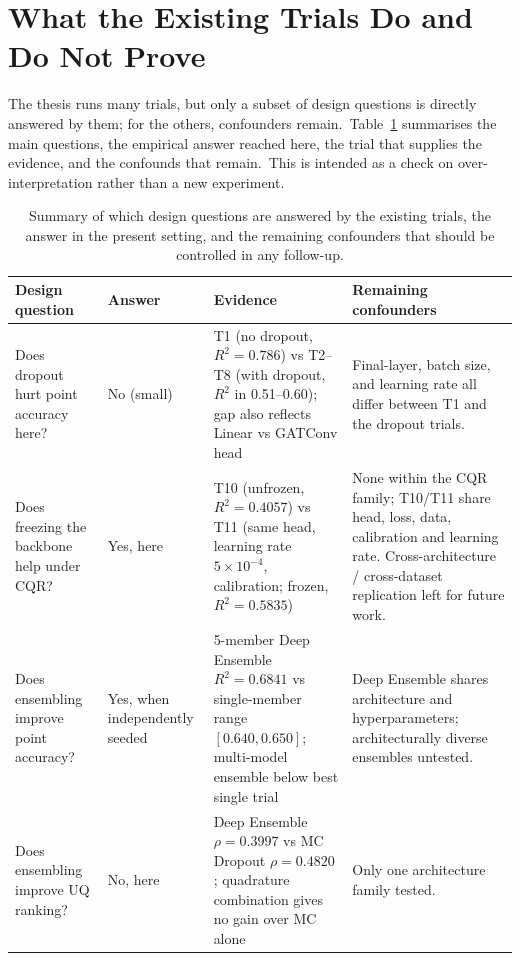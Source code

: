 \section{What the Existing Trials Do and Do Not Prove}\label{sec:ablation_summary}

The thesis runs many trials, but only a subset of design questions is directly answered by them; for the others, confounders remain.\ Table~\ref{tab:ablation_summary} summarises the main questions, the empirical answer reached here, the trial that supplies the evidence, and the confounds that remain.\ This is intended as a check on over-interpretation rather than a new experiment.

\begin{table}[p]
\centering
\caption[Ablation summary: what the trials do and do not prove]{Summary of which design questions are answered by the existing trials, the answer in the present setting, and the remaining confounders that should be controlled in any follow-up.}
\label{tab:ablation_summary}
\footnotesize
\setlength{\tabcolsep}{4pt}
\renewcommand{\arraystretch}{1.15}
\begin{tabular}{p{3.6cm}p{2.0cm}p{4.2cm}p{3.7cm}}
\toprule
\textbf{Design question} & \textbf{Answer} & \textbf{Evidence} & \textbf{Remaining confounders} \\
\midrule
Does dropout hurt point accuracy here? &
No (small) &
T1 (no dropout, $R^2 = 0.786$) vs T2--T8 (with dropout, $R^2$ in 0.51--0.60); gap also reflects Linear vs GATConv head &
Final-layer, batch size, and learning rate all differ between T1 and the dropout trials. \\
\midrule
Does freezing the backbone help under CQR? &
Yes, here &
T10 (unfrozen, $R^2 = 0.4057$) vs T11 (same head, learning rate $5\times10^{-4}$, calibration; frozen, $R^2 = 0.5835$) &
None within the CQR family; T10/T11 share head, loss, data, calibration and learning rate. Cross-architecture / cross-dataset replication left for future work. \\
\midrule
Does ensembling improve point accuracy? &
Yes, when independently seeded &
5-member Deep Ensemble $R^2 = 0.6841$ vs single-member range $[0.640, 0.650]$; multi-model ensemble below best single trial &
Deep Ensemble shares architecture and hyperparameters; architecturally diverse ensembles untested. \\
\midrule
Does ensembling improve UQ ranking? &
No, here &
Deep Ensemble $\rho = 0.3997$ vs MC Dropout $\rho = 0.4820$; quadrature combination gives no gain over MC alone &
Only one architecture family tested. \\

\end{tabular}
\end{table}
